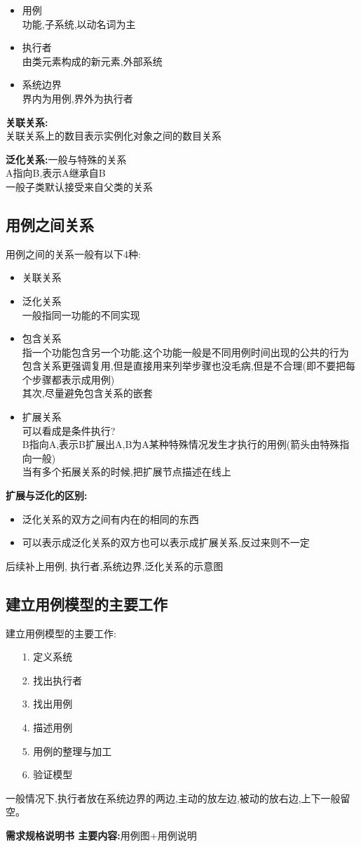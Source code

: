 \documentclass[UTF8,a4paper]{ctexart}
\begin{document}
\begin{itemize}
  \item 用例\\
  功能,子系统,以动名词为主
  \item 执行者\\
  由类元素构成的新元素,外部系统
  \item 系统边界\\
  界内为用例,界外为执行者
\end{itemize}

\textbf{关联关系:}\\
关联关系上的数目表示实例化对象之间的数目关系

\textbf{泛化关系:}一般与特殊的关系\\
A指向B,表示A继承自B\\
一般子类默认接受来自父类的关系

\subsection{用例之间关系}
用例之间的关系一般有以下4种:
\begin{itemize}
  \item 关联关系
  \item 泛化关系\\
  一般指同一功能的不同实现
  \item 包含关系\\
  指一个功能包含另一个功能,这个功能一般是不同用例时间出现的公共的行为\\
  包含关系更强调复用,但是直接用来列举步骤也没毛病,但是不合理(即不要把每个步骤都表示成用例)\\
  其次,尽量避免包含关系的嵌套
  \item 扩展关系\\
  可以看成是条件执行?\\
  B指向A,表示B扩展出A,B为A某种特殊情况发生才执行的用例(箭头由特殊指向一般)\\
  当有多个拓展关系的时候,把扩展节点描述在线上
\end{itemize}

\textbf{扩展与泛化的区别:}
\begin{itemize}
  \item 泛化关系的双方之间有内在的相同的东西
  \item 可以表示成泛化关系的双方也可以表示成扩展关系,反过来则不一定
\end{itemize}

{\color{red}后续补上用例, 执行者,系统边界,泛化关系的示意图}

\subsection{建立用例模型的主要工作}
建立用例模型的主要工作:
\begin{itemize}
  \item [1.]定义系统
  \item[2.]找出执行者
  \item[3.]找出用例
  \item[4.]描述用例
  \item[5.]用例的整理与加工
  \item[6.]验证模型
\end{itemize}

一般情况下,执行者放在系统边界的两边,主动的放左边,被动的放右边,上下一般留空。

\textbf{需求规格说明书 主要内容:}用例图+用例说明
\end{document}
